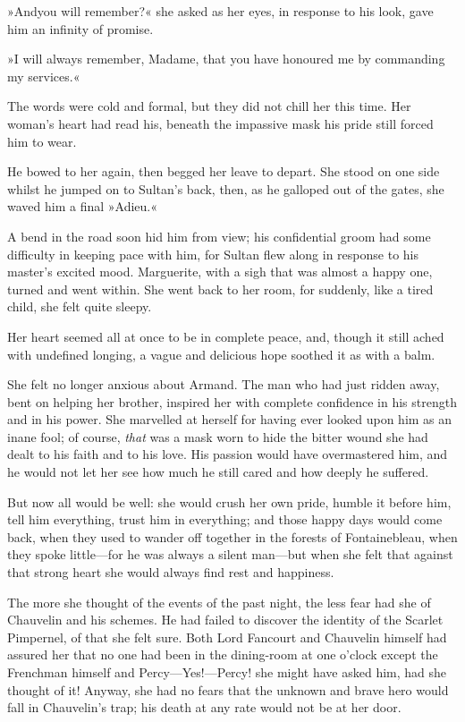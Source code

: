 »And\textellipsis \allowbreak  you will remember?\textellipsis« she asked as her eyes, in response to his look, gave him an infinity of promise.

»I will always remember, Madame, that you have honoured me by commanding my services.«

The words were cold and formal, but they did not chill her this time. Her woman's heart had read his, beneath the impassive mask his pride still forced him to wear.

He bowed to her again, then begged her leave to depart. She stood on one side whilst he jumped on to Sultan's back, then, as he galloped out of the gates, she waved him a final »Adieu.«

A bend in the road soon hid him from view; his confidential groom had some difficulty in keeping pace with him, for Sultan flew along in response to his master's excited mood. Marguerite, with a sigh that was almost a happy one, turned and went within. She went back to her room, for suddenly, like a tired child, she felt quite sleepy.

Her heart seemed all at once to be in complete peace, and, though it still ached with undefined longing, a vague and delicious hope soothed it as with a balm.

She felt no longer anxious about Armand. The man who had just ridden away, bent on helping her brother, inspired her with complete confidence in his strength and in his power. She marvelled at herself for having ever looked upon him as an inane fool; of course, \textit{that} was a mask worn to hide the bitter wound she had dealt to his faith and to his love. His passion would have overmastered him, and he would not let her see how much he still cared and how deeply he suffered.

But now all would be well: she would crush her own pride, humble it before him, tell him everything, trust him in everything; and those happy days would come back, when they used to wander off together in the forests of Fontainebleau, when they spoke little—for he was always a silent man—but when she felt that against that strong heart she would always find rest and happiness.

The more she thought of the events of the past night, the less fear had she of Chauvelin and his schemes. He had failed to discover the identity of the Scarlet Pimpernel, of that she felt sure. Both Lord Fancourt and Chauvelin himself had assured her that no one had been in the dining-room at one o'clock except the Frenchman himself and Percy—Yes!—Percy! she might have asked him, had she thought of it! Anyway, she had no fears that the unknown and brave hero would fall in Chauvelin's trap; his death at any rate would not be at her door.

